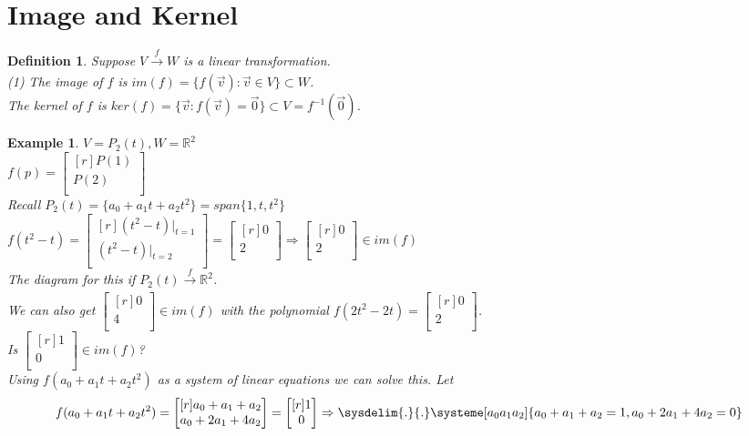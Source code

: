 \documentclass{report}
\newtheorem*{ex}{Example}
\newtheorem*{defn}{Definition}
\begin{document}
\section{Image and Kernel}
\begin{defn}
Suppose $V \xrightarrow[]{f} W$ is a linear transformation.\\
(1) The image of $f$ is $im(f)=\{f(\vec{v}): \vec{v}\in V\} \subset W$.\\
The kernel of $f$ is $ker(f)=\{\vec{v}:f(\vec{v})=\vec{0}\}\subset V = f^{-1}(\vec{0})$.
\end{defn}
\begin{ex}
$V=P_2(t), W=\mathbb{R}^2$\\
$f(p)=\begin{bmatrix}[r]P(1)\\P(2)\\\end{bmatrix}$\\
Recall $P_2(t)=\{a_0+a_1t+a_2t^2\} = span\{1,t,t^2\}$\\
$f(t^2-t)=\begin{bmatrix}[r](t^2-t)|_{t=1}\\(t^2-t)|_{t=2}\\\end{bmatrix}=\begin{bmatrix}[r]0\\2\\\end{bmatrix}\Rightarrow \begin{bmatrix}[r]0\\2\\\end{bmatrix}\in im(f)$\\
The diagram for this if $P_2(t)\xrightarrow[]{f} \mathbb{R}^2$.\\
We can also get $\begin{bmatrix}[r]0\\4\\\end{bmatrix} \in im(f)$ with the polynomial $f(2t^2-2t) = \begin{bmatrix}[r]0\\2\\\end{bmatrix}$.\\
Is $\begin{bmatrix}[r]1\\0\\\end{bmatrix} \in im(f)$?\\
Using $f(a_0+a_1t+a_2t^2)$ as a system of linear equations we can solve this. Let
\[ f(a_0+a_1t+a_2t^2) = \begin{bmatrix}[r]a_0+a_1+a_2\\a_0+2a_1+4a_2\\\end{bmatrix} = \begin{bmatrix}[r]1\\0\\\end{bmatrix} \Rightarrow \sysdelim{.}{.}\systeme[a_0a_1a_2]{a_0+a_1+a_2=1,a_0+2a_1+4a_2=0} \]
\end{ex}
\end{document}
